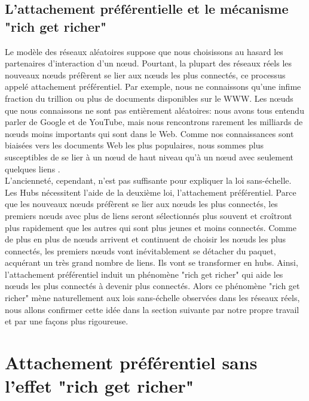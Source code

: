 \begin{sloppypar}
\subsection{L'attachement préférentielle et le mécanisme "rich get richer"}
\end{sloppypar}
Le modèle des réseaux aléatoires suppose que nous choisissons au hasard les partenaires d'interaction d'un nœud. Pourtant, la plupart des réseaux réels les nouveaux nœuds préfèrent se lier aux nœuds les plus connectés, ce processus appelé attachement préférentiel. Par exemple, nous ne connaissons qu'une infime fraction du trillion ou plus de documents disponibles sur le WWW. Les nœuds que nous connaissons ne sont pas entièrement aléatoires: nous avons tous entendu parler de Google et de YouTube, mais nous rencontrons rarement les milliards de nœuds moins importants qui sont dans le Web. Comme nos connaissances sont biaisées vers les documents Web les plus populaires, nous sommes plus susceptibles de se lier à un nœud de haut niveau qu'à un nœud avec seulement quelques liens \cite{Barabasi2002}.\\
L'ancienneté, cependant, n'est pas suffisante pour expliquer la loi sans-échelle. Les Hubs nécessitent l'aide de la deuxième loi, l'attachement préférentiel. Parce que les nouveaux nœuds préfèrent se lier aux nœuds les plus connectés, les premiers nœuds avec plus de liens seront sélectionnés plus souvent et croîtront plus rapidement que les autres qui sont plus jeunes et moins connectés. Comme de plus en plus de nœuds arrivent et continuent de choisir les nœuds les plus connectés, les premiers nœuds vont inévitablement se détacher du paquet, acquérant un très grand nombre de liens. Ils vont se transformer en hubs. Ainsi, l'attachement préférentiel induit un phénomène "rich get richer" qui aide les nœuds les plus connectés à devenir plus connectés. Alors ce phénomène "rich get richer" mène naturellement aux lois sans-échelle observées dans les réseaux réels, nous allons confirmer cette idée dans la section suivante par notre propre travail et par une façons plus rigoureuse.
\begin{sloppypar}
\section{Attachement préférentiel sans l'effet "rich get richer"}
\end{sloppypar}
